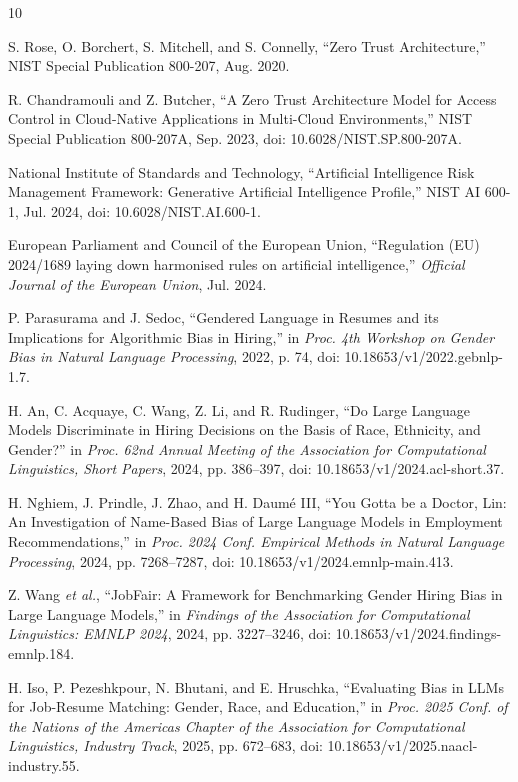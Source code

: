 \documentclass[conference]{IEEEtran}
\begin{document}
\begin{thebibliography}{10}

S. Rose, O. Borchert, S. Mitchell, and S. Connelly,
``Zero Trust Architecture,''
NIST Special Publication 800-207, Aug. 2020.

R. Chandramouli and Z. Butcher,
``A Zero Trust Architecture Model for Access Control in Cloud-Native Applications in Multi-Cloud Environments,''
NIST Special Publication 800-207A, Sep. 2023, doi: 10.6028/NIST.SP.800-207A.

National Institute of Standards and Technology,
``Artificial Intelligence Risk Management Framework: Generative Artificial Intelligence Profile,''
NIST AI 600-1, Jul. 2024, doi: 10.6028/NIST.AI.600-1.

European Parliament and Council of the European Union,
``Regulation (EU) 2024/1689 laying down harmonised rules on artificial intelligence,''
\emph{Official Journal of the European Union}, Jul. 2024.

P. Parasurama and J. Sedoc,
``Gendered Language in Resumes and its Implications for Algorithmic Bias in Hiring,''
in \emph{Proc. 4th Workshop on Gender Bias in Natural Language Processing}, 2022, p. 74, doi: 10.18653/v1/2022.gebnlp-1.7.

H. An, C. Acquaye, C. Wang, Z. Li, and R. Rudinger,
``Do Large Language Models Discriminate in Hiring Decisions on the Basis of Race, Ethnicity, and Gender?''
in \emph{Proc. 62nd Annual Meeting of the Association for Computational Linguistics, Short Papers}, 2024, pp. 386--397, doi: 10.18653/v1/2024.acl-short.37.

H. Nghiem, J. Prindle, J. Zhao, and H. Daum\'{e} III,
``You Gotta be a Doctor, Lin: An Investigation of Name-Based Bias of Large Language Models in Employment Recommendations,''
in \emph{Proc. 2024 Conf. Empirical Methods in Natural Language Processing}, 2024, pp. 7268--7287, doi: 10.18653/v1/2024.emnlp-main.413.

Z. Wang \emph{et al.},
``JobFair: A Framework for Benchmarking Gender Hiring Bias in Large Language Models,''
in \emph{Findings of the Association for Computational Linguistics: EMNLP 2024}, 2024, pp. 3227--3246, doi: 10.18653/v1/2024.findings-emnlp.184.

H. Iso, P. Pezeshkpour, N. Bhutani, and E. Hruschka,
``Evaluating Bias in LLMs for Job-Resume Matching: Gender, Race, and Education,''
in \emph{Proc. 2025 Conf. of the Nations of the Americas Chapter of the Association for Computational Linguistics, Industry Track}, 2025, pp. 672--683, doi: 10.18653/v1/2025.naacl-industry.55.


\end{thebibliography}
\end{document}
